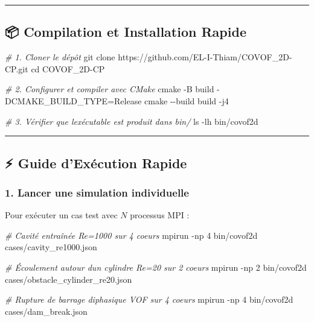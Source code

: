 \documentclass[
  french,
]{article}
\newenvironment{Shaded}{}{}
\newcommand{\AttributeTok}[1]{\textcolor[rgb]{0.49,0.56,0.16}{#1}}
\newcommand{\BuiltInTok}[1]{\textcolor[rgb]{0.00,0.50,0.00}{#1}}
\newcommand{\CommentTok}[1]{\textcolor[rgb]{0.38,0.63,0.69}{\textit{#1}}}
\newcommand{\ExtensionTok}[1]{#1}
\newcommand{\FunctionTok}[1]{\textcolor[rgb]{0.02,0.16,0.49}{#1}}
\newcommand{\NormalTok}[1]{#1}
\newcommand{\OperatorTok}[1]{\textcolor[rgb]{0.40,0.40,0.40}{#1}}
\begin{document}
\begin{center}\rule{0.5\linewidth}{0.5pt}\end{center}

\subsection{📦 Compilation et Installation
Rapide}\label{compilation-et-installation-rapide}

\begin{Shaded}
\begin{Highlighting}[]
\CommentTok{\# 1. Cloner le dépôt}
\FunctionTok{git}\NormalTok{ clone https://github.com/EL{-}I{-}Thiam/COVOF\_2D{-}CP.git}
\BuiltInTok{cd}\NormalTok{ COVOF\_2D{-}CP}

\CommentTok{\# 2. Configurer et compiler avec CMake}
\FunctionTok{cmake} \AttributeTok{{-}B}\NormalTok{ build }\AttributeTok{{-}DCMAKE\_BUILD\_TYPE}\OperatorTok{=}\NormalTok{Release}
\FunctionTok{cmake} \AttributeTok{{-}{-}build}\NormalTok{ build }\AttributeTok{{-}j4}

\CommentTok{\# 3. Vérifier que l\textquotesingle{}exécutable est produit dans bin/}
\FunctionTok{ls} \AttributeTok{{-}lh}\NormalTok{ bin/covof2d}
\end{Highlighting}
\end{Shaded}

\begin{center}\rule{0.5\linewidth}{0.5pt}\end{center}

\subsection{⚡ Guide d'Exécution
Rapide}\label{guide-dexuxe9cution-rapide}

\subsubsection{1. Lancer une simulation
individuelle}\label{lancer-une-simulation-individuelle}

Pour exécuter un cas test avec \(N\) processus MPI :

\begin{Shaded}
\begin{Highlighting}[]
\CommentTok{\# Cavité entraînée Re=1000 sur 4 coeurs}
\ExtensionTok{mpirun} \AttributeTok{{-}np}\NormalTok{ 4 bin/covof2d cases/cavity\_re1000.json}

\CommentTok{\# Écoulement autour d\textquotesingle{}un cylindre Re=20 sur 2 coeurs}
\ExtensionTok{mpirun} \AttributeTok{{-}np}\NormalTok{ 2 bin/covof2d cases/obstacle\_cylinder\_re20.json}

\CommentTok{\# Rupture de barrage diphasique VOF sur 4 coeurs}
\ExtensionTok{mpirun} \AttributeTok{{-}np}\NormalTok{ 4 bin/covof2d cases/dam\_break.json}
\end{Highlighting}
\end{Shaded}
\end{document}
